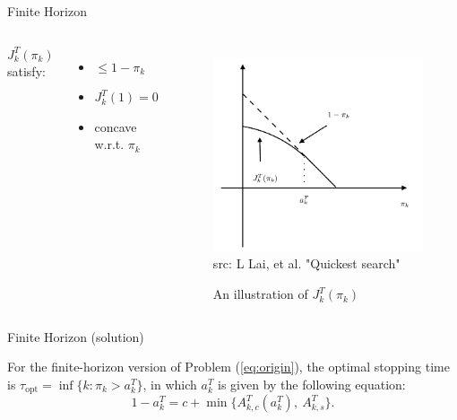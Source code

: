 \documentclass[xcolor={svgnames}]{beamer}
\begin{document}
\begin{frame}{Finite Horizon}
  \begin{columns}
    $J^T_k(\pi_k)$ satisfy:
    \bigskip
    \begin{itemize}
      \item $\le 1-\pi_k$
      \item $J^T_k(1) = 0$
      \item concave w.r.t. $\pi_k$
    \end{itemize}
    \pause

    \begin{figure}
        \centering
        \includegraphics[width=1.0\textwidth]{fig1}\\[-8pt]
        {\tiny src: L Lai, et al. "Quickest search"}
        \caption{An illustration of $J^T_k(\pi_k)$}
        \label{fig1}
    \end{figure}
  \end{columns}
\end{frame}
\begin{frame}{Finite Horizon (solution)}
  \begin{theorem}
    For the finite-horizon version of Problem (\ref{eq:origin}), the optimal stopping time is \alert{$\tau_{\text{opt}} = \inf\{k: \pi_k > a_k^T\}$}, in which $a_k^T$ is given by the following equation:
    \[
      1 - a_k^T = c + \min\{A_{k,c}^T(a_k^T), ~A_{k,s}^T\}.
    \]
  \end{theorem}

\end{frame}
\end{document}
